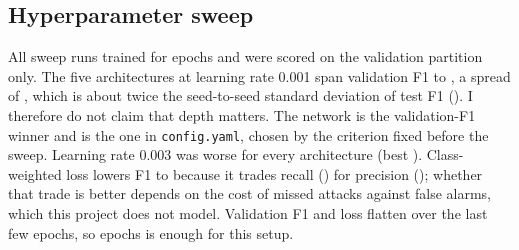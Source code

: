\documentclass[conference]{IEEEtran}
\begin{document}
\subsection{Hyperparameter sweep}
All \SweepRuns{} sweep runs trained for \SweepEpochs{} epochs and were scored on the validation partition only. The five architectures at learning rate 0.001 span validation F1 \SweepLrOneMin{} to \SweepLrOneMax{}, a spread of \SweepSpread{}, which is about twice the seed-to-seed standard deviation of test F1 (\SeedsBothGroupedFOneSd{}). I therefore do not claim that depth matters. The \SweepBestArch{} network is the validation-F1 winner and is the one in \texttt{config.yaml}, chosen by the criterion fixed before the sweep. Learning rate 0.003 was worse for every architecture (best \SweepLrThreeMax{}). Class-weighted loss lowers F1 to \SweepWeightedF{} because it trades recall (\SweepWeightedRec{}) for precision (\SweepWeightedPrec{}); whether that trade is better depends on the cost of missed attacks against false alarms, which this project does not model. Validation F1 and loss flatten over the last few epochs, so \ConfigEpochs{} epochs is enough for this setup.
\tabSweep
\end{document}

